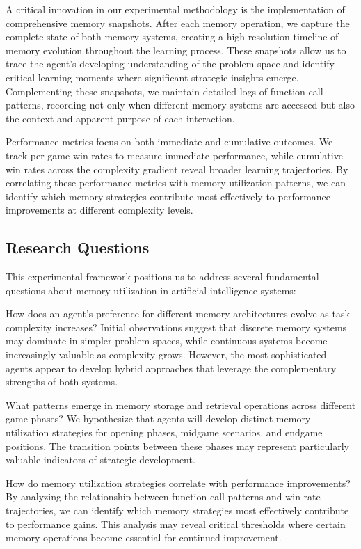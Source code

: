 \documentclass{article}
\begin{document}
A critical innovation in our experimental methodology is the implementation of comprehensive memory snapshots. After each memory operation, we capture the complete state of both memory systems, creating a high-resolution timeline of memory evolution throughout the learning process. These snapshots allow us to trace the agent's developing understanding of the problem space and identify critical learning moments where significant strategic insights emerge. Complementing these snapshots, we maintain detailed logs of function call patterns, recording not only when different memory systems are accessed but also the context and apparent purpose of each interaction.

Performance metrics focus on both immediate and cumulative outcomes. We track per-game win rates to measure immediate performance, while cumulative win rates across the complexity gradient reveal broader learning trajectories. By correlating these performance metrics with memory utilization patterns, we can identify which memory strategies contribute most effectively to performance improvements at different complexity levels.

\subsection{Research Questions}

This experimental framework positions us to address several fundamental questions about memory utilization in artificial intelligence systems:

How does an agent's preference for different memory architectures evolve as task complexity increases? Initial observations suggest that discrete memory systems may dominate in simpler problem spaces, while continuous systems become increasingly valuable as complexity grows. However, the most sophisticated agents appear to develop hybrid approaches that leverage the complementary strengths of both systems.

What patterns emerge in memory storage and retrieval operations across different game phases? We hypothesize that agents will develop distinct memory utilization strategies for opening phases, midgame scenarios, and endgame positions. The transition points between these phases may represent particularly valuable indicators of strategic development.

How do memory utilization strategies correlate with performance improvements? By analyzing the relationship between function call patterns and win rate trajectories, we can identify which memory strategies most effectively contribute to performance gains. This analysis may reveal critical thresholds where certain memory operations become essential for continued improvement.
\end{document}

